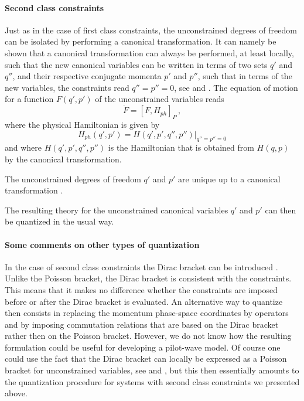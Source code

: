 \documentclass[12pt]{article}
\begin{document}
\paragraph{Second class constraints}
Just as in the case of first class constraints, the unconstrained degrees of freedom can be isolated by performing a canonical transformation. It can namely be shown that a canonical transformation can always be performed, at least locally, such that the new canonical variables can be written in terms of two sets $q'$ and $q''$, and their respective conjugate momenta $p'$ and $p''$, such that in terms of the new variables, the constraints read $q''=p''=0$, see \cite[p.\ 27-35]{gitman90} and \cite{maskawa76}. The equation of motion for a function $F(q',p')$ of the unconstrained variables reads
\begin{equation}
\dot{F} = [F,H_{ph}]_P\,,
\label{f.11}
\end{equation}
where the physical Hamiltonian is given by
\begin{equation}
H_{ph}(q',p') = H(q',p',q'',p'')\big|_{q''=p''=0}
\label{f.12}
\end{equation}
and where $H(q',p',q'',p'')$ is the Hamiltonian that is obtained from $H(q,p)$ by the canonical transformation. 

The unconstrained degrees of freedom $q'$ and $p'$ are unique up to a canonical transformation \cite[p.\ 32]{gitman90}.

The resulting theory for the unconstrained canonical variables $q'$ and $p'$ can then be quantized in the usual way.


\paragraph{Some comments on other types of quantization}
In the case of second class constraints the Dirac bracket can be introduced \cite{dirac64,hanson76,sundermeyer82,gitman90,henneaux91}. Unlike the Poisson bracket, the Dirac bracket is consistent with the constraints. This means that it makes no difference whether the constraints are imposed before or after the Dirac bracket is evaluated. An alternative way to quantize then consists in replacing the momentum phase-space coordinates by operators and by imposing commutation relations that are based on the Dirac bracket rather then on the Poisson bracket. However, we do not know how the resulting formulation could be useful for developing a pilot-wave model. Of course one could use the fact that the Dirac bracket can locally be expressed as a Poisson bracket for unconstrained variables, see \cite[p.\ 30]{gitman90} and \cite{maskawa76}, but this then essentially amounts to the quantization procedure for systems with second class constraints we presented above. 
\end{document}
